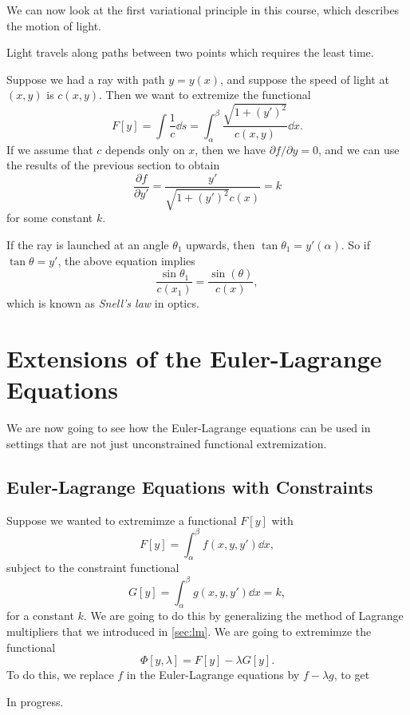 \documentclass[a4paper]{scrartcl}
\begin{document}
We can now look at the first variational principle in this course, which describes the motion of light.

\begin{law}
Light travels along paths between two points which requires the least time.
\end{law}

Suppose we had a ray with path $y = y(x)$, and suppose the speed of light at $(x, y)$ is $c(x, y)$. Then we want to extremize the functional
$$
F[y] = \int \frac{1}{c} \dd s = \int_{\alpha}^{\beta} \frac{\sqrt{1 + (y')^2}}{c(x, y)} \dd x.
$$
If we assume that $c$ depends only on $x$, then we have $\partial f /\partial y = 0$, and we can use the results of the previous section to obtain
$$
\frac{\partial f}{\partial y'} = \frac{y'}{\sqrt{1 + (y')^2} c(x)} = k
$$
for some constant $k$.

If the ray is launched at an angle $\theta_1$ upwards, then $\tan \theta_1 = y'(\alpha)$. So if $\tan \theta = y'$, the above equation implies
$$
\frac{\sin \theta_1}{c(x_1)} = \frac{\sin(\theta)}{c(x)},
$$
which is known as \emph{Snell's law} in optics.

\section{Extensions of the Euler-Lagrange Equations}

We are now going to see how the Euler-Lagrange equations can be used in settings that are not just unconstrained functional extremization.

\subsection{Euler-Lagrange Equations with Constraints}

Suppose we wanted to extremimze a functional $F[y]$ with
$$
F[y] = \int_{\alpha}^{\beta} f(x, y, y') \dd x,
$$
subject to the constraint functional
$$
G[y] = \int_{\alpha}^{\beta} g(x, y, y') \dd x = k,
$$
for a constant $k$. We are going to do this by generalizing the method of Lagrange multipliers that we introduced in \autoref{sec:lm}. We are going to extremimze the functional
$$
\Phi[y, \lambda] = F[y] - \lambda G[y].
$$
To do this, we replace $f$ in the Euler-Lagrange equations by $f - \lambda g$, to get


{\color{red} In progress.}
\end{document}
